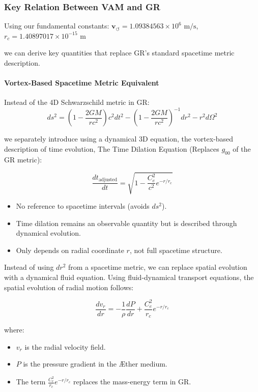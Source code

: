 \documentclass[a4paper,10pt]{article}
\begin{document}
\subsubsection*{Key Relation Between VAM and GR}
Using our fundamental constants:
$\mathbf{v}_{\scriptscriptstyle\boldsymbol{\circlearrowleft}} = 1.09384563 \times 10^6 \text{ m/s}$, $r_c = 1.40897017 \times 10^{-15} \text{ m}$

we can derive key quantities that replace GR's standard spacetime metric description.

\paragraph{Vortex-Based Spacetime Metric Equivalent}
Instead of the 4D Schwarzschild metric in GR:
\begin{equation*}
    ds^2 = \left( 1 - \frac{2GM}{rc^2} \right) c^2 dt^2 - \left( 1 - \frac{2GM}{rc^2} \right)^{-1} dr^2 - r^2 d\Omega^2
\end{equation*}

we separately introduce using a dynamical 3D equation, the vortex-based description of time evolution,
The Time Dilation Equation (Replaces $g_{00}$ of the GR metric):

\begin{equation*}
    \boxed{\frac{d t_\text{adjusted}}{d t} = \sqrt{1 - \frac{C_e^2}{c^2} e^{-r/r_c}}}
\end{equation*}


\begin{itemize}
\item No reference to spacetime intervals (avoids $ ds^2 $).
\item Time dilation remains an observable quantity but is described through dynamical evolution.
\item Only depends on radial coordinate $r$, not full spacetime structure.
\end{itemize}


Instead of using $ dr^2 $ from a spacetime metric, we can replace spatial evolution with a dynamical fluid equation. Using fluid-dynamical transport equations, the spatial evolution of radial motion follows:

\begin{equation*}
    \frac{d v_r}{d r} = - \frac{1}{\rho} \frac{d P}{d r} + \frac{C_e^2}{r_c} e^{-r/r_c}
\end{equation*}

where:

\begin{itemize}
\item $v_r$ is the radial velocity field.
\item $P$ is the pressure gradient in the Æther medium.
\item The term  $\frac{C_e^2}{r_c} e^{-r/r_c}$ replaces the mass-energy term in GR.
\end{itemize}
\end{document}

